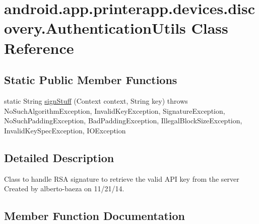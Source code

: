 \hypertarget{classandroid_1_1app_1_1printerapp_1_1devices_1_1discovery_1_1_authentication_utils}{}\section{android.\+app.\+printerapp.\+devices.\+discovery.\+Authentication\+Utils Class Reference}
\label{classandroid_1_1app_1_1printerapp_1_1devices_1_1discovery_1_1_authentication_utils}
\subsection*{Static Public Member Functions}
\begin{DoxyCompactItemize}
\item 
static String \hyperlink{classandroid_1_1app_1_1printerapp_1_1devices_1_1discovery_1_1_authentication_utils_a75f73ce6c66448ad3218d3ba04b9fd5a}{sign\+Stuff} (Context context, String key)  throws No\+Such\+Algorithm\+Exception, Invalid\+Key\+Exception, Signature\+Exception, No\+Such\+Padding\+Exception, Bad\+Padding\+Exception, Illegal\+Block\+Size\+Exception, Invalid\+Key\+Spec\+Exception, I\+O\+Exception 
\end{DoxyCompactItemize}


\subsection{Detailed Description}
Class to handle R\+SA signature to retrieve the valid A\+PI key from the server Created by alberto-\/baeza on 11/21/14. 

\subsection{Member Function Documentation}
\mbox{\label{classandroid_1_1app_1_1printerapp_1_1devices_1_1discovery_1_1_authentication_utils_a75f73ce6c66448ad3218d3ba04b9fd5a}} 
